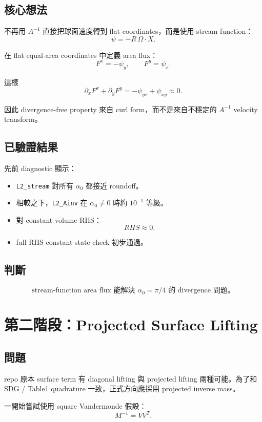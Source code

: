 \documentclass[UTF8,12pt,a4paper]{ctexart}
\begin{document}
\subsection{核心想法}

不再用 $A^{-1}$ 直接把球面速度轉到 flat coordinates，而是使用 stream function：
\[
\psi=-R\,\Omega\cdot X.
\]

在 flat equal-area coordinates 中定義 area flux：
\[
F^x=-\psi_y,\qquad F^y=\psi_x.
\]

這樣
\[
\partial_xF^x+\partial_yF^y
=
-\psi_{yx}+\psi_{xy}
\approx0.
\]

因此 divergence-free property 來自 curl form，而不是來自不穩定的 $A^{-1}$ velocity transform。

\subsection{已驗證結果}

先前 diagnostic 顯示：
\begin{itemize}
  \item \texttt{L2\_stream} 對所有 $\alpha_0$ 都接近 roundoff。
  \item 相較之下，\texttt{L2\_Ainv} 在 $\alpha_0\neq0$ 時約 $10^{-1}$ 等級。
  \item 對 constant volume RHS：
  \[
  RHS\approx0.
  \]
  \item full RHS constant-state check 初步通過。
\end{itemize}

\subsection{判斷}

\[
\boxed{
\text{stream-function area flux 能解決 }\alpha_0=\pi/4\text{ 的 divergence 問題。}
}
\]

\section{第二階段：Projected Surface Lifting}

\subsection{問題}

repo 原本 surface term 有 diagonal lifting 與 projected lifting 兩種可能。為了和 SDG / Table1 quadrature 一致，正式方向應採用 projected inverse mass。

一開始嘗試使用 square Vandermonde 假設：
\[
M^{-1}=VV^T.
\]
\end{document}
